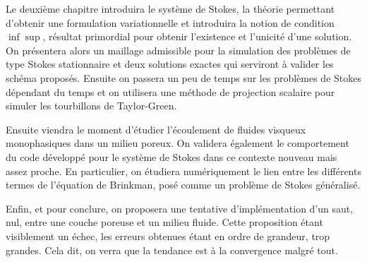 Le deuxième chapitre introduira le système de Stokes, la théorie permettant d'obtenir une formulation variationnelle et introduira la notion de condition $\inf \sup$, résultat primordial pour obtenir l'existence et l'unicité d'une solution. On présentera alors un maillage admissible pour la simulation des problèmes de type Stokes stationnaire et deux solutions exactes qui serviront à valider les schéma proposés. Ensuite on passera un peu de temps sur les problèmes de Stokes dépendant du temps et on utilisera une méthode de projection scalaire pour simuler les tourbillons de Taylor-Green.

Ensuite viendra le moment d'étudier l'écoulement de fluides visqueux monophasiques dans un milieu poreux. On validera également le comportement du code développé pour le système de Stokes dans ce contexte nouveau mais assez proche. En particulier, on étudiera numériquement le lien entre les différents termes de l'équation de Brinkman, posé comme un problème de Stokes généralisé.

Enfin, et pour conclure, on proposera une tentative d'implémentation d'un saut, nul, entre une couche poreuse et un milieu fluide. Cette proposition étant visiblement un échec, les erreurs obtenues étant en ordre de grandeur, trop grandes. Cela dit, on verra que la tendance est à la convergence malgré tout. 

